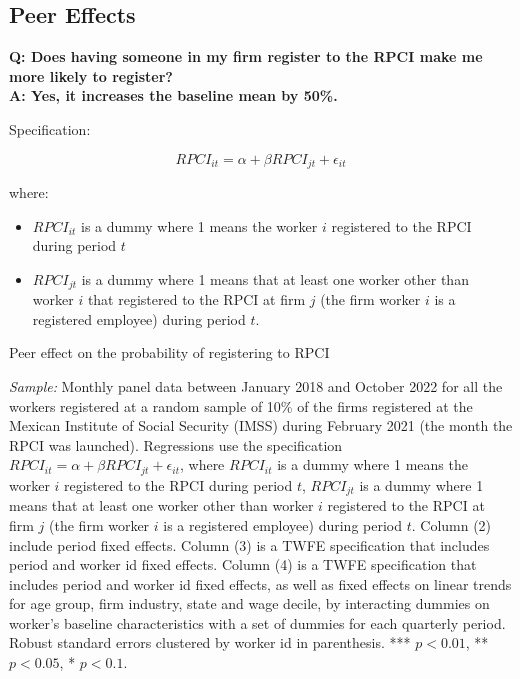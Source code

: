 \documentclass[oneside,11pt]{article}
\begin{document}
\normalsize

\clearpage

\subsection{Peer Effects} \label{peer}

\textbf{Q: Does having someone in my firm register to the RPCI make me more likely to register?}
\\
\textbf{A: Yes, it increases the baseline mean by 50\%.}

Specification:

$$RPCI_{it} = \alpha + \beta RPCI_{jt} + \epsilon_{it}$$

where:

\begin{itemize}
    \item $RPCI_{it}$ is a dummy where 1 means the worker $i$ registered to the RPCI during period $t$
    \item $RPCI_{jt}$ is a dummy where 1 means that at least one worker other than worker $i$ that registered to the RPCI at firm $j$ (the firm worker $i$ is a registered employee) during period $t$.
\end{itemize}

\begin{table}[H]
    \caption{Peer effect on the probability of registering to RPCI}
    \label{peer_rpci_rfc_rpci_dum}
    \begin{center}
    \scriptsize{}
    \end{center}
\end{table}

\scriptsize{
\noindent \textit{Sample:} Monthly panel data between January 2018 and October 2022 for all the workers registered at a random sample of 10\% of the firms registered at the Mexican Institute of Social Security (IMSS) during February 2021 (the month the RPCI was launched). Regressions use the specification $RPCI_{it} = \alpha + \beta RPCI_{jt} + \epsilon_{it}$, where $RPCI_{it}$ is a dummy where 1 means the worker $i$ registered to the RPCI during period $t$, $RPCI_{jt}$ is a dummy where 1 means that at least one worker other than worker $i$ registered to the RPCI at firm $j$ (the firm worker $i$ is a registered employee) during period $t$. Column (2) include period fixed effects. Column (3) is a TWFE specification that includes period and worker id fixed effects. Column (4) is a TWFE specification that includes period and worker id fixed effects, as well as fixed effects on linear trends for age group, firm industry, state and wage decile, by interacting dummies on worker's baseline characteristics with a set of dummies for each quarterly period. Robust standard errors clustered by worker id in parenthesis. *** $p<0.01$, ** $p<0.05$, * $p<0.1$.}
\end{document}
